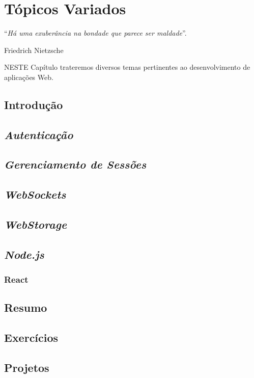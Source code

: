 \chapter{Tópicos Variados}\label{cap:topicosVariados}
\epigraph{``\textit{Há uma exuberância na bondade que parece ser maldade}''.}{Friedrich Nietzsche}

\lettrine[lines=4, lhang=0.1, lraise=0, loversize=0.2, findent=0.1em]{\textcolor{corTema}{N}}{ESTE} Capítulo trateremos diversos temas pertinentes ao desenvolvimento de aplicações Web.

\vfill

\section{Introdução}

\section{\textit{Autenticação}}

\section{\textit{Gerenciamento de Sessões}}

\section{\textit{WebSockets}}

\section{\textit{WebStorage}}

\section{\textit{Node.js}}

\subsection{React}

\section{Resumo}

\section{Exercícios}

\section{Projetos}
